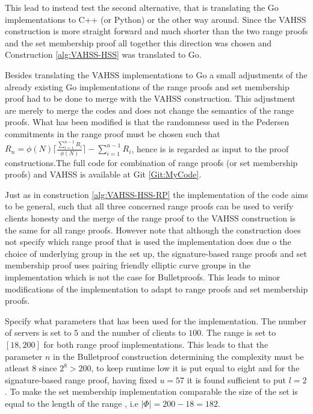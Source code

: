 This lead to instead test the second alternative, that is translating  the Go implementations to C++ (or Python) or the other way around. Since the VAHSS construction is more straight forward and much shorter than the two range proofs and the set membership proof all together this direction was chosen and Construction \ref{alg:VAHSS-HSS} was translated to Go.

Besides translating the VAHSS implementations to Go a small adjustments of the already existing Go implementations of the range proofs and set membership proof  had to be done to merge with the VAHSS construction. This adjustment are merely to merge the codes and does not change the semantics of the range proofs. What has been  modified is that the randomness used in the Pedersen commitments in the range proof must be chosen such that $R_n = \phi(N)\lceil \frac{\sum_{i=1}^{n-1}R_i}{\phi(N)}\rceil- \sum_{i=1}^{n-1}R_i$, hence is is regarded as input to the proof constructions.The full code for combination of range proofs (or set membership proofs) and VAHSS is available at Git \ref{Git:MyCode}. 

Just as in construction \ref{alg:VAHSS-HSS-RP} the implementation of the code aims to be  general, such that all three concerned range proofs can be used to verify clients honesty and the merge of the range proof to the VAHSS construction is the same for all range proofs. However note that although the construction does not specify which range proof that is used the implementation does due o the choice of underlying group in the set up, the signature-based range proofs and set membership proof uses pairing friendly elliptic curve groups in the implementation which is not the case for Bulletproofs. This leads to minor modifications of the implementation to adapt to range proofs and set membership proofs.

Specify what parameters that has been used for the implementation. The number of servers is set to $5$ and the number of clients to $100$.  The range is set to $[18,200]$ for both range proof implementations. This leads to that the parameter $n$ in the Bulletproof construction determining the complexity must be atleast $8$ since $2^8>200$, to keep runtime low it is put equal to eight and for the signature-based range proof, having fixed $u=57$ it is found sufficient to put $l=2$. To make the set membership implementation comparable the size of the set is equal to the length of the range , i.e $|\Phi|=200-18 = 182$.

